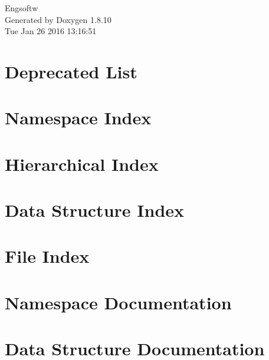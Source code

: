 \documentclass[twoside]{book}
\newcommand{\+}{\discretionary{\mbox{\scriptsize$\hookleftarrow$}}{}{}}
\newcommand{\clearemptydoublepage}{%
  \newpage{\pagestyle{empty}\cleardoublepage}%
}
\begin{document}
\hypersetup{pageanchor=false,
             bookmarks=true,
             bookmarksnumbered=true,
             pdfencoding=unicode
            }
\begin{titlepage}
\vspace*{7cm}
\begin{center}%
{\Large Engsoftw }\\
\vspace*{1cm}
{\large Generated by Doxygen 1.8.10}\\
\vspace*{0.5cm}
{\small Tue Jan 26 2016 13:16:51}\\
\end{center}
\end{titlepage}
\clearemptydoublepage
\tableofcontents
\clearemptydoublepage
{}
\hypersetup{pageanchor=true}

\chapter{Deprecated List}
\label{deprecated}
\hypertarget{deprecated}{}

\chapter{Namespace Index}

\chapter{Hierarchical Index}

\chapter{Data Structure Index}

\chapter{File Index}

\chapter{Namespace Documentation}

\chapter{Data Structure Documentation}
























\end{document}
